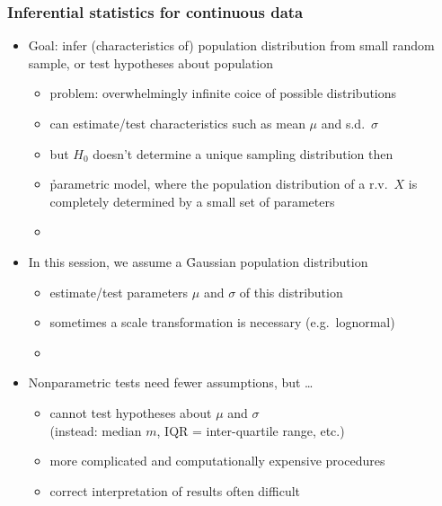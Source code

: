 \documentclass[t]{beamer} %
\begin{document}
\begin{frame}
  \frametitle{Inferential statistics for continuous data}

  \begin{itemize}
  \item Goal: infer (characteristics of) population distribution from small
    random sample, or test hypotheses about population
    \begin{itemize}
    \item problem: overwhelmingly infinite coice of possible distributions
    \item can estimate/test characteristics such as mean $\mu$ and s.d.\ $\sigma$
    \item but $H_0$ doesn't determine a unique sampling distribution then
    \item[\hand] \h{parametric} model, where the population distribution of a
      r.v.\ $X$ is completely determined by a small set of parameters
    \item[]
    \end{itemize}
  \item<2-> In this session, we assume a \h{Gaussian population} distribution%
    \begin{itemize}
    \item estimate/test parameters $\mu$ and $\sigma$ of this distribution 
    \item sometimes a scale transformation is necessary (e.g.\ lognormal)
    \item[]
    \end{itemize}
  \item<3-> Nonparametric tests need fewer assumptions, but \ldots
    \begin{itemize}
    \item cannot test hypotheses about $\mu$ and $\sigma$\\
      (instead: median $m$, IQR = inter-quartile range, etc.)
    \item more complicated and computationally expensive procedures
    \item correct interpretation of results often difficult
    \end{itemize}
  \end{itemize}
\end{frame}
\end{document}
